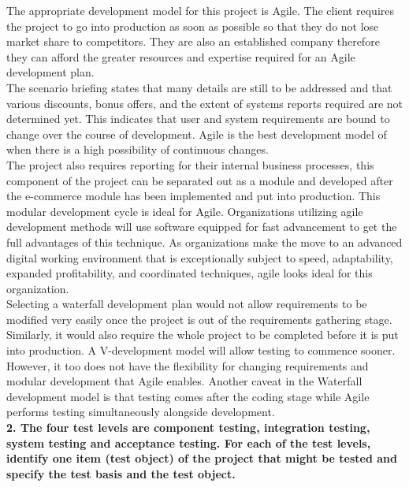 \documentclass[a4paper,man,natbib]{apa6}
\begin{document}
The appropriate development model for this project is Agile. The client requires the project to go into production as soon as possible so that they do not lose market share to competitors. They are also an established company therefore they can afford the greater resources and expertise required for an Agile development plan.\\
The scenario briefing states that many details are still to be addressed and that various discounts, bonus offers, and the extent of systems reports required are not determined yet. This indicates that user and system requirements are bound to change over the course of development. Agile is the best development model of when there is a high possibility of continuous changes.\\
The project also requires reporting for their internal business processes, this component of the project can be separated out as a module and developed after the e-commerce module has been implemented and put into production. This modular development cycle is ideal for Agile.
Organizations utilizing agile development methods will use software equipped for fast advancement to get the full advantages of this technique. As organizations make the move to an advanced digital working environment that is exceptionally subject to speed, adaptability, expanded profitability, and coordinated techniques, agile looks ideal for this organization. \citep{Alexander2018} \\
Selecting a waterfall development plan would not allow requirements to be modified very easily once the project is out of the requirements gathering stage. Similarly, it would also require the whole project to be completed before it is put into production. A V-development model will allow testing to commence sooner. However, it too does not have the flexibility for changing requirements and modular development that Agile enables. Another caveat in the Waterfall development model is that testing comes after the coding stage while Agile performs testing simultaneously alongside development. \citep{Angelina2015} \\

\pagebreak
\noindent
\textbf{2. The four test levels are component testing, integration testing, system testing and acceptance testing.  For each of the test levels, identify one item (test object) of the project that might be tested and specify the test basis and the test object.}\\
\end{document}
